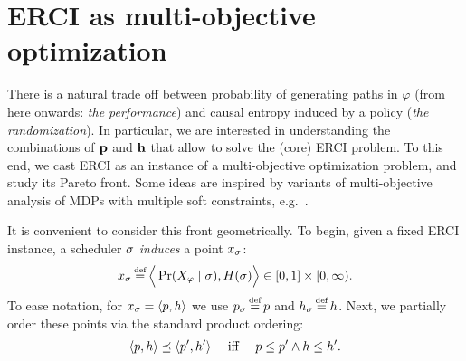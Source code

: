 \section{ERCI as multi-objective optimization}\label{sec:convex}
There is a natural trade off
between probability of generating paths in $\varphi$ (from here
onwards: \emph{the performance}) and causal entropy induced by a
policy (\emph{the randomization}).  In particular,
we are interested in understanding the combinations of $\mathbf{p}$
and $\mathbf{h}$ that allow to solve the (core) ERCI problem. To this
end, we cast ERCI as an instance of a multi-objective optimization problem, and
study its Pareto front. Some ideas are inspired by variants of multi-objective analysis of MDPs with multiple soft constraints, e.g.~\cite{DBLP:conf/stacs/ChatterjeeMH06,DBLP:conf/tacas/EtessamiKVY07}.


It is convenient to consider this front geometrically.
To begin, given a fixed ERCI instance, a scheduler $\sigma$
\emph{induces} a point $x_\sigma$:
\begin{equation}
  x_\sched \eqdef \Big\langle \Pr(X_\varphi \mid \sched), H(\sched) \Big\rangle \in [0,1] \times [0,\infty).  
\end{equation}
To ease notation, for $x_\sigma = \langle p,h \rangle$ we use
$\scp_\sched \eqdef \scp$ and $\rndp_\sched \eqdef \rndp$. Next, we
partially order these points via the standard product ordering:
\begin{equation}
  \langle p,h \rangle \preceq \langle p',h' \rangle \quad\text{ iff }\quad p \leq p' \wedge h \leq h'.
\end{equation}

